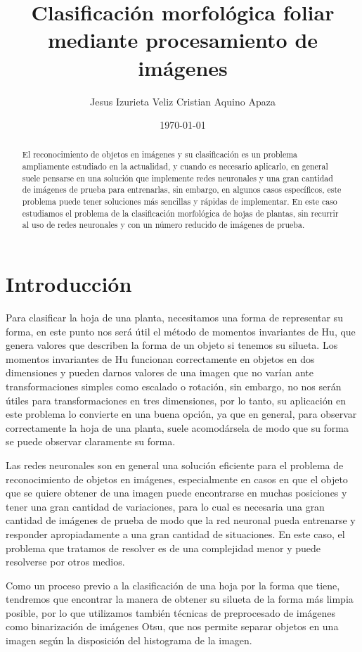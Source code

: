 \documentclass[letter]{article}
\author{Jesus Izurieta Veliz \quad Cristian Aquino Apaza}
\date{\today}
\title{Clasificación morfológica foliar mediante procesamiento de imágenes}
\begin{document}
\maketitle
\begin{abstract}
El reconocimiento de objetos en imágenes y su clasificación es un problema
ampliamente estudiado en la actualidad, y cuando es necesario aplicarlo, en
general suele pensarse en una solución que implemente redes neuronales y una
gran cantidad de imágenes de prueba para entrenarlas, sin embargo, en algunos
casos específicos, este problema puede tener soluciones más sencillas y rápidas
de implementar. En este caso estudiamos el problema de la clasificación
morfológica de hojas de plantas, sin recurrir al uso de redes neuronales y con un
número reducido de imágenes de prueba.
\end{abstract}


\section{Introducción}
\label{sec:org9206202}
Para clasificar la hoja de una planta, necesitamos una forma de representar su
forma, en este punto nos será útil el método de momentos invariantes de Hu, que
genera valores que describen la forma de un objeto si tenemos su silueta. Los
momentos invariantes de Hu funcionan correctamente en objetos en dos dimensiones
\cite{Hu1962} y pueden darnos valores de una imagen que no varían ante
transformaciones simples como escalado o rotación, sin embargo, no nos serán
útiles para transformaciones en tres dimensiones, por lo tanto, su aplicación en
este problema lo convierte en una buena opción, ya que en general, para observar
correctamente la hoja de una planta, suele acomodársela de modo que su forma se
puede observar claramente su forma.

Las redes neuronales son en general una solución eficiente para el problema de
reconocimiento de objetos en imágenes, especialmente en casos en que el objeto
que se quiere obtener de una imagen puede encontrarse en muchas posiciones y
tener una gran cantidad de variaciones, para lo cual es necesaria una gran
cantidad de imágenes de prueba de modo que la red neuronal pueda entrenarse y
responder apropiadamente a una gran cantidad de situaciones. En este caso, el
problema que tratamos de resolver es de una complejidad menor y puede resolverse
por otros medios.

Como un proceso previo a la clasificación de una hoja por la forma que tiene,
tendremos que encontrar la manera de obtener su silueta de la forma más limpia
posible, por lo que utilizamos también técnicas de preprocesado de imágenes como
binarización de imágenes Otsu, que nos permite separar objetos en una imagen
según la disposición del histograma de la imagen.
\end{document}
